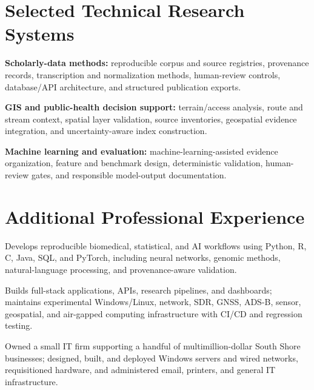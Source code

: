 \documentclass[10.5pt,letterpaper]{article}
\begin{document}
\section*{Selected Technical Research Systems}
\begin{cvbullets}
    \item \textbf{Scholarly-data methods:} reproducible corpus and source registries, provenance records, transcription and normalization methods, human-review controls, database/API architecture, and structured publication exports.
    \item \textbf{GIS and public-health decision support:} terrain/access analysis, route and stream context, spatial layer validation, source inventories, geospatial evidence integration, and uncertainty-aware index construction.
    \item \textbf{Machine learning and evaluation:} machine-learning-assisted evidence organization, feature and benchmark design, deterministic validation, human-review gates, and responsible model-output documentation.
\end{cvbullets}

\section*{Additional Professional Experience}
\begin{cvbullets}
    \item Develops reproducible biomedical, statistical, and AI workflows using Python, R, C, Java, SQL, and PyTorch, including neural networks, genomic methods, natural-language processing, and provenance-aware validation.
    \item Builds full-stack applications, APIs, research pipelines, and dashboards; maintains experimental Windows/Linux, network, SDR, GNSS, ADS-B, sensor, geospatial, and air-gapped computing infrastructure with CI/CD and regression testing.
\end{cvbullets}


\begin{cvbullets}
    \item Owned a small IT firm supporting a handful of multimillion-dollar South Shore businesses; designed, built, and deployed Windows servers and wired networks, requisitioned hardware, and administered email, printers, and general IT infrastructure.
\end{cvbullets}
\end{document}
